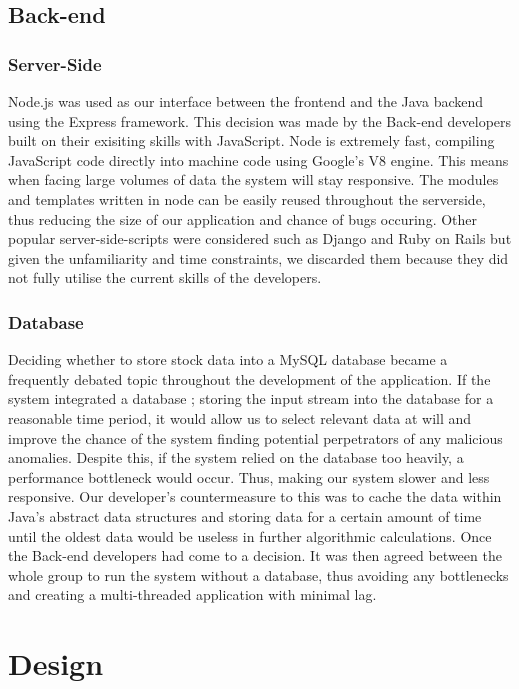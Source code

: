 \documentclass[12pt]{article}
\begin{document}
  \subsection{Back-end}
    \subsubsection{Server-Side}
    Node.js was used as our interface between the frontend and the Java backend using the Express framework.
    This decision was made by the Back-end developers built on their exisiting skills with JavaScript. Node is extremely fast,
    compiling JavaScript code directly into machine code using Google's V8 engine. This means when facing large volumes of data
    the system will stay responsive. The modules and templates written in node can be easily
    reused throughout the serverside, thus reducing the size of our application and chance of bugs occuring.
    \newline
    Other popular server-side-scripts were considered such as Django and Ruby on Rails but given the unfamiliarity and time
    constraints, we discarded them because they did not fully utilise the current skills of the developers.
    \subsubsection{Database}
    Deciding whether to store stock data into a MySQL database became a frequently debated topic throughout the development of the application.
    If the system integrated a database ; storing the input stream into the database for a reasonable time period, it would allow us to
    select relevant data at will and improve the chance of the system finding potential perpetrators of any malicious anomalies.
    \newline
    Despite this, if the system relied on the database too heavily, a performance bottleneck would occur. Thus, making our system slower and less responsive.
    Our developer's countermeasure to this was to cache the data within Java's abstract data structures and storing data for a certain amount
    of time until the oldest data would be useless in further algorithmic calculations.
    \newline
    Once the Back-end developers had come to a decision. It was then agreed between the whole group to run the system without a database, thus avoiding
    any bottlenecks and creating a multi-threaded application with minimal lag.
\section{Design}
\end{document}
